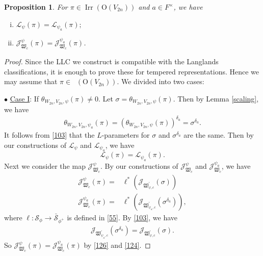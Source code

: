 \documentclass[article]{article}
\numberwithin{equation}{section}
\newtheorem{proposition}[theorem]{Proposition}
\theoremstyle{definition}
\DeclareMathOperator{\Irr}{Irr}
\DeclareMathOperator{\Irrt}{Irr_{temp}}
\begin{document}
 
\begin{proposition}\label{notdependonpsi}
	For $\pi\in \Irr\left( \mathrm O(V_{2n})\right)$ and $a\in F^{\times}$, we have 
	\begin{enumerate}[(i)]
		\item $\mathcal L_{\psi}(\pi)=\mathcal L_{\psi_a}(\pi);$
		\item $\mathcal J^\psi_{\mathfrak W_{c}}(\pi)= \mathcal J^{\psi_a}_{\mathfrak W_{c}}(\pi)$. 	
	\end{enumerate}	
\end{proposition}
\begin{proof}
Since the LLC we construct is compatible with the Langlands classifications, it is enough to prove these for tempered representations. Hence we may assume that $\pi\in \Irrt \left(\mathrm O(V_{2n})\right)$.  
We divided into two cases: 

$\bullet$ \underline{Case I}: If $\theta_{W_{2n},V_{2n},\psi}(\pi)\neq 0$. Let $\sigma=\theta_{W_{2n},V_{2n},\psi}(\pi)$. Then by Lemma \ref{scaling}, we have 
\begin{equation*}
\begin{aligned}
\theta_{W_{2n}, V_{2n},  \psi_a}(\pi)=\left(\theta_{W_{2n}, V_{2n}, \psi}(\pi)\right)^{\delta_a}=\sigma^{\delta_a}. 
\end{aligned}
\end{equation*}
It follows from \ref{103} that the $L$-parameters for $\sigma$ and $\sigma^{\delta_a}$ are the same. Then by our constructions of $\mathcal L_\psi$ and $\mathcal L_{\psi_a}$, we have 
$$\mathcal L_{\psi}(\pi)=\mathcal L_{\psi_a}(\pi).$$ Next we consider the map $\mathcal J^{\psi}_{\mathfrak W_{c}}$. By our constructions of $\mathcal J^{\psi}_{\mathfrak W_{c}}$ and $\mathcal J^{\psi_a}_{\mathfrak W_{c}}$, we have  
		\begin{equation}\label{126}
		\begin{aligned}
		\mathcal J^\psi_{\mathfrak W_{c}}(\pi)=&\ell^*\left(\mathcal J_{\mathfrak W^\prime_{\psi,c}}(\sigma)\right)\\
		\mathcal J^{\psi_a}_{\mathfrak W_{c}}(\pi)=&\ell^*\left(\mathcal J_{\mathfrak W^\prime_{\psi_a,c}}(\sigma^{\delta_a})\right),
		\end{aligned}
		\end{equation}
		where $\ell: \mathcal {S}_{\phi}\rightarrow \bar {\mathcal S}_{\phi^+}$ is defined in \ref{55}. By \ref{103}, we have 
		\begin{equation}\label{124}
		\begin{aligned}
		\mathcal J_{\mathfrak W^\prime_{\psi_a,c}}(\sigma^{\delta_a})=\mathcal J_{\mathfrak W^\prime_{\psi,c}}(\sigma).
		\end{aligned}
		\end{equation}
		So $\mathcal J^\psi_{\mathfrak W_{c}}(\pi)= \mathcal J^{\psi_a}_{\mathfrak W_{c}}(\pi)$ by \ref{126} and \ref{124}. 
		

\end{proof}
\end{document}
